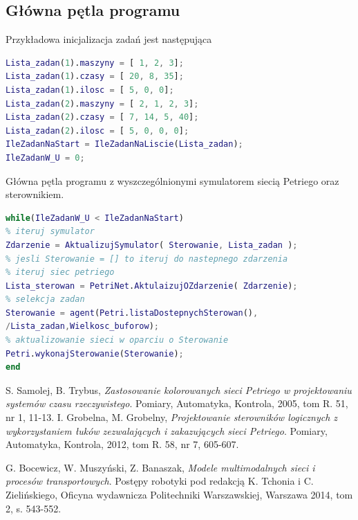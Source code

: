 \documentclass[10pt, a4paper]{article}
\begin{document}
\subsection{Główna pętla programu}
Przykładowa inicjalizacja zadań jest następująca
\begin{lstlisting}[language=Matlab, frame=single,tabsize=1, caption={Inicjalizacja zadań w pliku main.m}]
Lista_zadan(1).maszyny = [ 1, 2, 3];
Lista_zadan(1).czasy = [ 20, 8, 35];
Lista_zadan(1).ilosc = [ 5, 0, 0];
Lista_zadan(2).maszyny = [ 2, 1, 2, 3];
Lista_zadan(2).czasy = [ 7, 14, 5, 40];
Lista_zadan(2).ilosc = [ 5, 0, 0, 0];
IleZadanNaStart = IleZadanNaLiscie(Lista_zadan);
IleZadanW_U = 0;
\end{lstlisting}
Główna pętla programu z wyszczególnionymi symulatorem siecią Petriego oraz sterownikiem.
\begin{lstlisting}[language=Matlab, frame=single,tabsize=1, caption={Część pliku main.m}]
while(IleZadanW_U < IleZadanNaStart)
% iteruj symulator
Zdarzenie = AktualizujSymulator( Sterowanie, Lista_zadan );
% jesli Sterowanie = [] to iteruj do nastepnego zdarzenia
% iteruj siec petriego
Lista_sterowan = PetriNet.AktulaizujOZdarzenie( Zdarzenie);
% selekcja zadan
Sterowanie = agent(Petri.listaDostepnychSterowan(),
/Lista_zadan,Wielkosc_buforow);
% aktualizowanie sieci w oparciu o Sterowanie
Petri.wykonajSterowanie(Sterowanie);
end
\end{lstlisting}
\begin{thebibliography}{9}
  S. Samolej, B. Trybus,
  \emph{Zastosowanie kolorowanych sieci Petriego w projektowaniu systemów czasu rzeczywistego}.
  Pomiary, Automatyka, Kontrola,
  2005,
  tom R. 51, nr 1,
  11-13.
  I. Grobelna, M. Grobelny,
  \emph{Projektowanie sterowników logicznych z wykorzystaniem łuków zezwalających i zakazujących sieci Petriego}.	
  Pomiary, Automatyka, Kontrola,
  2012,
  tom R. 58, nr 7,
  605-607.
  
  G. Bocewicz, W. Muszyński, Z. Banaszak,
  \emph{Modele multimodalnych sieci i procesów transportowych}.
  Postępy robotyki pod redakcją K. Tchonia i C. Zielińskiego,
  Oficyna wydawnicza Politechniki Warszawskiej,
   Warszawa 2014,
   tom 2, s. 543-552.

\end{thebibliography}
\end{document}
